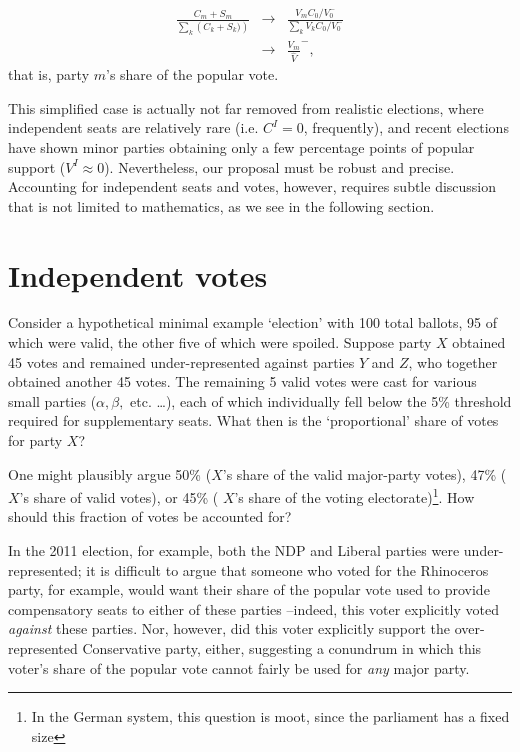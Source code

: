\documentclass[DIV=calc, paper=a4, fontsize=11pt, twocolumn]{scrartcl}	 %
\begin{document}
\begin{align}
\label{eq:seatshare}
\frac{C_m+S_m}{ \sum\limits_k\left( C_k+S_k) \right)} &\to& \frac{V_m C_0/V_0^-}{ \sum\limits_k V_k C_0/V_0^-} \\
&\to& \frac{V_m}{\hat{V}}^-,
\end{align}
that is, party $m$'s share of the popular vote. 

This simplified case is actually not far removed from realistic elections, where independent seats are relatively rare (i.e. $C^I=0$, frequently), and recent elections have shown minor parties obtaining only a few percentage points of popular support ($V^I \approx 0$). 
Nevertheless, our proposal must be robust and precise. Accounting for independent seats and votes, however, requires subtle discussion that is not limited to mathematics, as we see in the following section. 


\section{Independent votes}
\label{sec:outliers}
Consider a hypothetical minimal example `election' with 100 total ballots, 95 of which were valid, the other five of which were spoiled. Suppose party $X$ obtained 45 votes and remained under-represented against parties $Y$ and $Z$, who together obtained another 45 votes. The remaining 5 valid votes were cast for various small parties ($\alpha,\beta,$ etc. \ldots), each of which individually fell below the 5\% threshold required for supplementary seats.
What then is the `proportional' share of votes for party $X$?

One might plausibly argue 50\% ($X$'s share of the valid major-party votes), 47\% ( $X$'s share of valid votes), or 45\% ( $X$'s share of the voting electorate)\footnote{In the German system, this question is moot, since the parliament has a fixed size}. 
How should this fraction of votes be accounted for?

In the 2011 election, for example, both the NDP and Liberal parties were under-represented; it is difficult to argue that someone who voted for the Rhinoceros party, for example, would want their share of the popular vote used to provide compensatory seats to either of these parties --indeed, this voter explicitly voted \emph{against} these parties. 
Nor, however, did this voter explicitly support the over-represented Conservative party, either, suggesting a conundrum in which this voter's share of the popular vote cannot fairly be used for \emph{any} major party.
\end{document}
